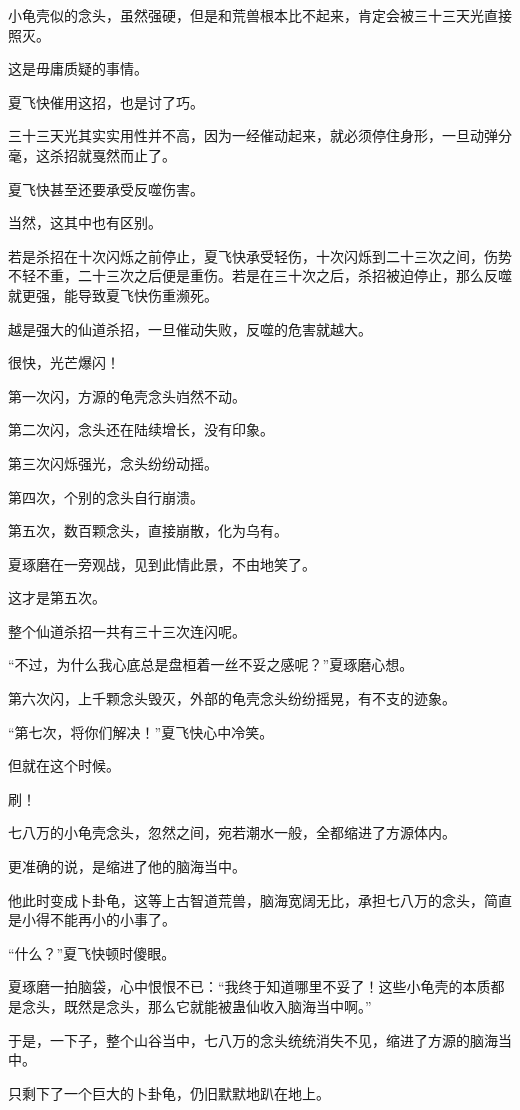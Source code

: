 \begin{this_body}
小龟壳似的念头，虽然强硬，但是和荒兽根本比不起来，肯定会被三十三天光直接照灭。

这是毋庸质疑的事情。

夏飞快催用这招，也是讨了巧。

三十三天光其实实用性并不高，因为一经催动起来，就必须停住身形，一旦动弹分毫，这杀招就戛然而止了。

夏飞快甚至还要承受反噬伤害。

当然，这其中也有区别。

若是杀招在十次闪烁之前停止，夏飞快承受轻伤，十次闪烁到二十三次之间，伤势不轻不重，二十三次之后便是重伤。若是在三十次之后，杀招被迫停止，那么反噬就更强，能导致夏飞快伤重濒死。

越是强大的仙道杀招，一旦催动失败，反噬的危害就越大。

很快，光芒爆闪！

第一次闪，方源的龟壳念头岿然不动。

第二次闪，念头还在陆续增长，没有印象。

第三次闪烁强光，念头纷纷动摇。

第四次，个别的念头自行崩溃。

第五次，数百颗念头，直接崩散，化为乌有。

夏琢磨在一旁观战，见到此情此景，不由地笑了。

这才是第五次。

整个仙道杀招一共有三十三次连闪呢。

“不过，为什么我心底总是盘桓着一丝不妥之感呢？”夏琢磨心想。

第六次闪，上千颗念头毁灭，外部的龟壳念头纷纷摇晃，有不支的迹象。

“第七次，将你们解决！”夏飞快心中冷笑。

但就在这个时候。

刷！

七八万的小龟壳念头，忽然之间，宛若潮水一般，全都缩进了方源体内。

更准确的说，是缩进了他的脑海当中。

他此时变成卜卦龟，这等上古智道荒兽，脑海宽阔无比，承担七八万的念头，简直是小得不能再小的小事了。

“什么？”夏飞快顿时傻眼。

夏琢磨一拍脑袋，心中恨恨不已：“我终于知道哪里不妥了！这些小龟壳的本质都是念头，既然是念头，那么它就能被蛊仙收入脑海当中啊。”

于是，一下子，整个山谷当中，七八万的念头统统消失不见，缩进了方源的脑海当中。

只剩下了一个巨大的卜卦龟，仍旧默默地趴在地上。


\end{this_body}
